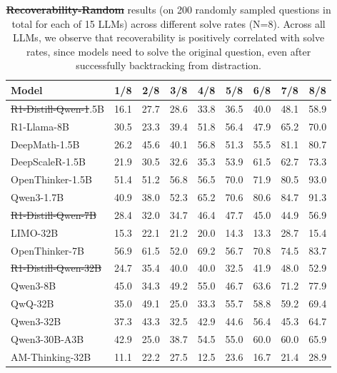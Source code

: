 \documentclass{article} %
\providecommand{\DIFaddtex}[1]{{\protect\color{blue}\uwave{#1}}} %
\providecommand{\DIFdeltex}[1]{{\protect\color{red}\sout{#1}}}                      %
\providecommand{\DIFaddFL}[1]{\DIFadd{#1}} %
\providecommand{\DIFdelFL}[1]{\DIFdel{#1}} %
\providecommand{\DIFaddbeginFL}{} %
\providecommand{\DIFaddendFL}{} %
\providecommand{\DIFdelbeginFL}{} %
\providecommand{\DIFdelendFL}{} %
\providecommand{\DIFadd}[1]{\texorpdfstring{\DIFaddtex{#1}}{#1}} %
\providecommand{\DIFdel}[1]{\texorpdfstring{\DIFdeltex{#1}}{}} %
\newcommand{\DIFscaledelfig}{0.5}
\newlength{\DIFdelgraphicswidth} %
\newlength{\DIFdelgraphicsheight} %
\newcommand{\DIFaddincludegraphics}[2][]{{\color{blue}\fbox{\DIFOincludegraphics[#1]{#2}}}} %
\newcommand{\DIFdelincludegraphics}[2][]{%
\sbox{\DIFdelgraphicsbox}{\DIFOincludegraphics[#1]{#2}}%
\settoboxwidth{\DIFdelgraphicswidth}{\DIFdelgraphicsbox} %
\settoboxtotalheight{\DIFdelgraphicsheight}{\DIFdelgraphicsbox} %
\scalebox{\DIFscaledelfig}{%
\parbox[b]{\DIFdelgraphicswidth}{\usebox{\DIFdelgraphicsbox}\\[-\baselineskip] \rule{\DIFdelgraphicswidth}{0em}}\llap{\resizebox{\DIFdelgraphicswidth}{\DIFdelgraphicsheight}{%
\setlength{\unitlength}{\DIFdelgraphicswidth}%
\begin{picture}(1,1)%
\thicklines\linethickness{2pt} %
{\color[rgb]{1,0,0}\put(0,0){\framebox(1,1){}}}%
{\color[rgb]{1,0,0}\put(0,0){\line( 1,1){1}}}%
{\color[rgb]{1,0,0}\put(0,1){\line(1,-1){1}}}%
\end{picture}%
}\hspace*{3pt}}} %
} %
\DeclareRobustCommand{\DIFaddbeginFL}{\DIFOaddbeginFL \let\includegraphics\DIFaddincludegraphics} %
\DeclareRobustCommand{\DIFaddendFL}{\DIFOaddendFL \let\includegraphics\DIFOincludegraphics} %
\DeclareRobustCommand{\DIFdelbeginFL}{\DIFOdelbeginFL \let\includegraphics\DIFdelincludegraphics} %
\DeclareRobustCommand{\DIFdelendFL}{\DIFOaddendFL \let\includegraphics\DIFOincludegraphics} %
\begin{document}
\begin{table}[t]
  \centering
  \small
  \begin{tabular}{l|cccccccc}
    \toprule
    \textbf{Model} &
    \textbf{1/8} & \textbf{2/8} & \textbf{3/8} & \textbf{4/8} &
    \textbf{5/8} & \textbf{6/8} & \textbf{7/8} & \textbf{8/8} \\
    \midrule
    \DIFdelbeginFL \DIFdelFL{R1-Distill-Qwen-1}\DIFdelendFL \DIFaddbeginFL \DIFaddFL{R1-Qwen-1}\DIFaddendFL .5B        & 16.1 & 27.7 & 28.6 & 33.8 & 36.5 & 40.0 & 48.1 & 58.9 \\
    R1-Llama-8B         & 30.5 & 23.3 & 39.4 & 51.8 & 56.4 & 47.9 & 65.2 & 70.0 \\
    DeepMath-1.5B       & 26.2 & 45.6 & 40.1 & 56.8 & 51.3 & 55.5 & 81.1 & 80.7 \\
    DeepScaleR-1.5B     & 21.9 & 30.5 & 32.6 & 35.3 & 53.9 & 61.5 & 62.7 & 73.3 \\
    OpenThinker-1.5B    & 51.4 & 51.2 & 56.8 & 56.5 & 70.0 & 71.9 & 80.5 & 93.0 \\
    Qwen3-1.7B          & 40.9 & 38.0 & 52.3 & 65.2 & 70.6 & 80.6 & 84.7 & 91.3 \\
    \midrule
    \DIFdelbeginFL \DIFdelFL{R1-Distill-Qwen-7B          }\DIFdelendFL \DIFaddbeginFL \DIFaddFL{R1-Qwen-7B          }\DIFaddendFL & 28.4 & 32.0 & 34.7 & 46.4 & 47.7 & 45.0 & 44.9 & 56.9 \\
    LIMO-32B            & 15.3 & 22.1 & 21.2 & 20.0 & 14.3 & 13.3 & 28.7 & 15.4 \\
    OpenThinker-7B      & 56.9 & 61.5 & 52.0 & 69.2 & 56.7 & 70.8 & 74.5 & 83.7 \\
    \DIFdelbeginFL \DIFdelFL{R1-Distill-Qwen-32B         }\DIFdelendFL \DIFaddbeginFL \DIFaddFL{R1-Qwen-32B         }\DIFaddendFL & 24.7 & 35.4 & 40.0 & 40.0 & 32.5 & 41.9 & 48.0 & 52.9 \\
    \midrule
    Qwen3-8B            & 45.0 & 34.3 & 49.2 & 55.0 & 46.7 & 63.6 & 71.2 & 77.9 \\
    QwQ-32B             & 35.0 & 49.1 & 25.0 & 33.3 & 55.7 & 58.8 & 59.2 & 69.4 \\
    Qwen3-32B           & 37.3 & 43.3 & 32.5 & 42.9 & 44.6 & 56.4 & 45.3 & 64.7 \\
    Qwen3-30B-A3B           & 42.9 & 25.0 & 38.7 & 54.5 & 55.0 & 60.0 & 60.0 & 65.9 \\
    AM-Thinking-32B     & 11.1 & 22.2 & 27.5 & 12.5 & 23.6 & 16.7 & 21.4 & 28.9 \\
    \bottomrule
  \end{tabular}
  \caption{\DIFdelbeginFL \textbf{\DIFdelFL{Recoverability-Random}} %
\DIFdelendFL \DIFaddbeginFL \textbf{\DIFaddFL{Recoverability (individual)}} \DIFaddendFL results (on 200 randomly sampled questions in total for each of 15 LLMs) across different solve rates (N=8). Across all LLMs, we observe that recoverability is positively correlated with solve rates, since models need to solve the original question, even after successfully backtracking from distraction.}
  \label{tab:sr_curve_results}
\end{table}
\end{document}
